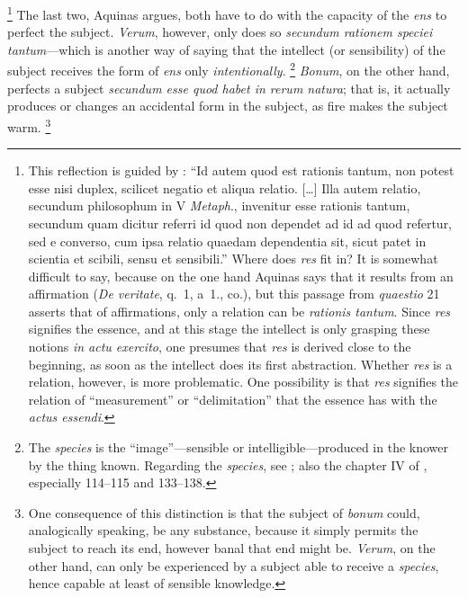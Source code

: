 {\footnote{This reflection is guided by \cite[q.~21, a.~1, co.]{st:deveritate}{}: ``Id autem quod est rationis tantum, non potest esse nisi duplex, scilicet negatio et aliqua relatio. [\ldots] Illa autem relatio, secundum philosophum in V \emph{Metaph}., invenitur esse rationis tantum, secundum quam dicitur referri id quod non dependet ad id ad quod refertur, sed e converso, cum ipsa relatio quaedam dependentia sit, sicut patet in scientia et scibili, sensu et sensibili.'' Where does \emph{res} fit in? It is somewhat difficult to say, because on the one hand Aquinas says that it results from an affirmation (\emph{De veritate}, q.~1, a~1., co.), but this passage from \emph{quaestio} 21 asserts that of affirmations, only a relation can be \emph{rationis tantum}. Since \emph{res} signifies the essence, and at this stage the intellect is only grasping these notions \emph{in actu exercito}, one presumes that \emph{res} is derived close to the beginning, as soon as the intellect does its first abstraction. Whether \emph{res} is a relation, however, is more problematic. One possibility is that \emph{res} signifies the relation of ``measurement'' or ``delimitation'' that the essence has with the \emph{actus essendi}.} The last two, Aquinas argues, both have to do with the capacity of the \emph{ens} to perfect the subject. \emph{Verum}, however, only does so \emph{secundum rationem speciei tantum}---which is another way of saying that the intellect (or sensibility) of the subject receives the form of \emph{ens} only \emph{intentionally}.%
%
\footnote{The \emph{species} is the ``image''---sensible or intelligible---produced in the knower by the thing known. Regarding the \emph{species}, see \cite[277--279]{definance:etre-et-agir}; also the chapter IV of \cite[73--142]{lucas:hombre}, especially 114--115 and 133--138.}
%
\emph{Bonum}, on the other hand, perfects a subject \emph{secundum esse quod habet in rerum natura}; that is, it actually produces or changes an accidental form in the subject, as fire makes the subject warm.%
%
\footnote{One consequence of this distinction is that the subject of \emph{bonum} could, analogically speaking, be any substance, because it simply permits the subject to reach its end, however banal that end might be. \emph{Verum}, on the other hand, can only be experienced by a subject able to receive a \emph{species}, hence capable at least of sensible knowledge.

}}
